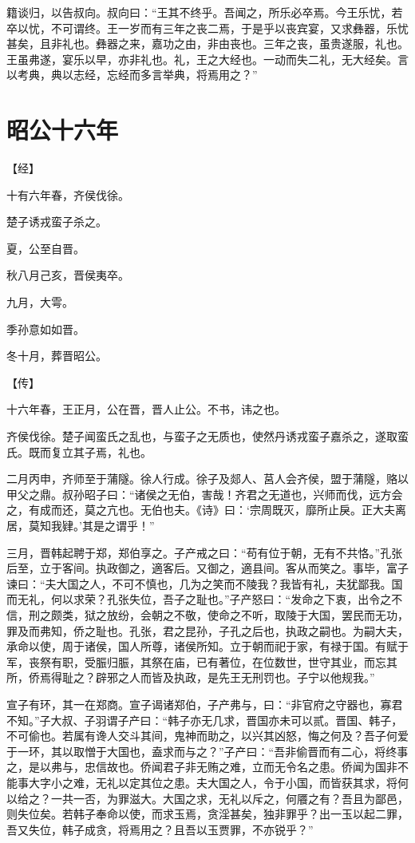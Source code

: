 \documentclass[a4paper,12pt,UTF8,twoside]{ctexbook}
\begin{document}
籍谈归，以告叔向。叔向曰：“王其不终乎。吾闻之，所乐必卒焉。今王乐忧，若卒以忧，不可谓终。王一岁而有三年之丧二焉，于是乎以丧宾宴，又求彝器，乐忧甚矣，且非礼也。彝器之来，嘉功之由，非由丧也。三年之丧，虽贵遂服，礼也。王虽弗遂，宴乐以早，亦非礼也。礼，王之大经也。一动而失二礼，无大经矣。言以考典，典以志经，忘经而多言举典，将焉用之？”


\chapter{昭公十六年}



【经】

十有六年春，齐侯伐徐。

楚子诱戎蛮子杀之。

夏，公至自晋。

秋八月己亥，晋侯夷卒。

九月，大雩。

季孙意如如晋。

冬十月，葬晋昭公。

【传】

十六年春，王正月，公在晋，晋人止公。不书，讳之也。

齐侯伐徐。楚子闻蛮氏之乱也，与蛮子之无质也，使然丹诱戎蛮子嘉杀之，遂取蛮氏。既而复立其子焉，礼也。

二月丙申，齐师至于蒲隧。徐人行成。徐子及郯人、莒人会齐侯，盟于蒲隧，赂以甲父之鼎。叔孙昭子曰：“诸侯之无伯，害哉！齐君之无道也，兴师而伐，远方会之，有成而还，莫之亢也。无伯也夫。《诗》曰：‘宗周既灭，靡所止戾。正大夫离居，莫知我肄。’其是之谓乎！”

三月，晋韩起聘于郑，郑伯享之。子产戒之曰：“苟有位于朝，无有不共恪。”孔张后至，立于客间。执政御之，適客后。又御之，適县间。客从而笑之。事毕，富子谏曰：“夫大国之人，不可不慎也，几为之笑而不陵我？我皆有礼，夫犹鄙我。国而无礼，何以求荣？孔张失位，吾子之耻也。”子产怒曰：“发命之下衷，出令之不信，刑之颇类，狱之放纷，会朝之不敬，使命之不听，取陵于大国，罢民而无功，罪及而弗知，侨之耻也。孔张，君之昆孙，子孔之后也，执政之嗣也。为嗣大夫，承命以使，周于诸侯，国人所尊，诸侯所知。立于朝而祀于家，有禄于国。有赋于军，丧祭有职，受脤归脤，其祭在庙，已有著位，在位数世，世守其业，而忘其所，侨焉得耻之？辟邪之人而皆及执政，是先王无刑罚也。子宁以他规我。”

宣子有环，其一在郑商。宣子谒诸郑伯，子产弗与，曰：“非官府之守器也，寡君不知。”子大叔、子羽谓子产曰：“韩子亦无几求，晋国亦未可以贰。晋国、韩子，不可偷也。若属有谗人交斗其间，鬼神而助之，以兴其凶怒，悔之何及？吾子何爱于一环，其以取憎于大国也，盍求而与之？”子产曰：“吾非偷晋而有二心，将终事之，是以弗与，忠信故也。侨闻君子非无贿之难，立而无令名之患。侨闻为国非不能事大字小之难，无礼以定其位之患。夫大国之人，令于小国，而皆获其求，将何以给之？一共一否，为罪滋大。大国之求，无礼以斥之，何餍之有？吾且为鄙邑，则失位矣。若韩子奉命以使，而求玉焉，贪淫甚矣，独非罪乎？出一玉以起二罪，吾又失位，韩子成贪，将焉用之？且吾以玉贾罪，不亦锐乎？”
\end{document}
